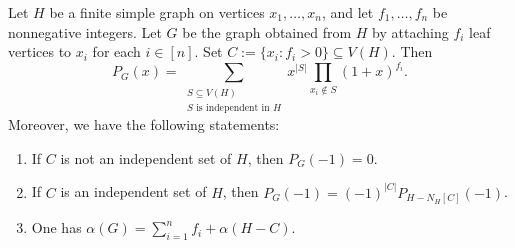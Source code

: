 \documentclass[12pt]{amsart}
\theoremstyle{plain}
\theoremstyle{definition}
\begin{document}
\begin{prop}\label{prop:leaf-attachment}
Let \(H\) be a finite simple graph on vertices \(x_1,\dots,x_n\), and let
\(f_1,\dots,f_n\) be nonnegative integers. Let \(G\) be the graph obtained from \(H\)
by attaching \(f_i\) leaf vertices to \(x_i\) for each \(i\in[n]\). Set \(C:=\{ x_i : f_i>0 \}\subseteq V(H)\).
Then
\[
P_G(x)=
\sum_{\substack{S\subseteq V(H)\\ S \text{ is independent in }H}}
x^{|S|}\prod_{x_i\notin S}(1+x)^{f_i}.
\]
Moreover, we have the following statements:
\begin{enumerate}
\item[\textup{(a)}] If \(C\) is not an independent set of \(H\), then \(P_G(-1)=0\).
\item[\textup{(b)}] If \(C\) is an independent set of \(H\), then \(P_G(-1)=(-1)^{|C|}P_{H-N_H[C]}(-1)\).
\item[\textup{(c)}] One has
\(
\alpha(G)=\sum_{i=1}^n f_i+\alpha(H-C) \).
\end{enumerate}
\end{prop}
\end{document}
